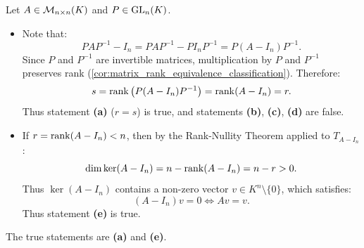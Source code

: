 \begin{exercisesolution*}
\label{sol:rank_invariance_similarity_mc}
Let $A \in \mathcal{M}_{n \times n}(K)$ and $P \in \operatorname{GL}_n(K)$.
\begin{itemize}
    \item Note that:
    \[
    P A P^{-1} - I_n = P A P^{-1} - P I_n P^{-1} = P (A - I_n) P^{-1}.
    \]
    Since $P$ and $P^{-1}$ are invertible matrices, multiplication by $P$ and $P^{-1}$ preserves rank (\cref{cor:matrix_rank_equivalence_classification}). Therefore:
    \[
    s = \operatorname{rank}\big(P(A - I_n)P^{-1}\big) = \operatorname{rank}(A - I_n) = r.
    \]
    Thus statement \textbf{(a)} ($r = s$) is true, and statements \textbf{(b)}, \textbf{(c)}, \textbf{(d)} are false.

    \item If $r = \operatorname{rank}(A - I_n) < n$, then by the Rank-Nullity Theorem applied to $T_{A - I_n}$:
    \[
    \dim \ker(A - I_n) = n - \operatorname{rank}(A - I_n) = n - r > 0.
    \]
    Thus $\ker(A - I_n)$ contains a non-zero vector $v \in K^n \setminus \{0\}$, which satisfies:
    \[
    (A - I_n) v = 0 \iff Av = v.
    \]
    Thus statement \textbf{(e)} is true.
\end{itemize}
The true statements are \textbf{(a)} and \textbf{(e)}.
\end{exercisesolution*}

